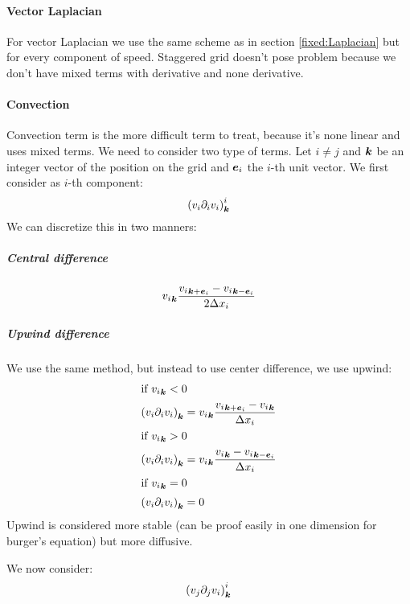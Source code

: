 \paragraph{Vector Laplacian}
\label{fixed:vect:laplacian}
For vector Laplacian we use the same scheme as in section \ref{fixed:Laplacian} but for every component of speed.
Staggered grid doesn't pose problem because we don't have mixed terms with derivative and none derivative.

\paragraph{Convection}

Convection term is the more difficult term to treat, because it's none linear and uses mixed terms.
We need to consider two type of terms. Let $i\neq j$ and ${\boldsymbol {k}}$ be an integer vector of the position on the grid
and ${\boldsymbol {e}}_i$ the $i$-th unit vector.
We first consider as $i$-th component:
\begin{equation}
\left(v_{i}\partial_{i}v_{i}\right)^{i}_{{\boldsymbol {k}}}
\end{equation}
We can discretize this in two manners:

\subparagraph{Central difference}
\begin{equation}
{v_{i}}_{{\boldsymbol {k}}}\frac{{v_{i}}_{{\boldsymbol {k}}+{\boldsymbol {e}}_i}-{v_{i}}_{{\boldsymbol {k}}-{\boldsymbol {e}}_i}}{2\Delta x_{i}}
\end{equation}

\subparagraph{Upwind difference}
\label{fixed:upwind}

We use the same method, but instead to use center difference, we use upwind:
\begin{align}
\intertext{if ${v_{i}}_{{\boldsymbol {k}}}<0$}
\left(v_{i}\partial_{i}v_{i}\right)_{{\boldsymbol {k}}}&={v_{i}}_{{\boldsymbol {k}}}\frac{{v_{i}}_{{\boldsymbol {k}}+{\boldsymbol {e}}_i}-{v_{i}}_{{\boldsymbol {k}}}}{\Delta x_{i}}\\
\intertext{if ${v_{i}}_{{\boldsymbol {k}}}>0$}
\left(v_{i}\partial_{i}v_{i}\right)_{{\boldsymbol {k}}}&={v_{i}}_{{\boldsymbol {k}}}\frac{{v_{i}}_{{\boldsymbol {k}}}-{v_{i}}_{{\boldsymbol {k}}-{\boldsymbol {e}}_i}}{\Delta x_{i}}\\
\intertext{if ${v_{i}}_{{\boldsymbol {k}}}=0$}
\left(v_{i}\partial_{i}v_{i}\right)_{{\boldsymbol {k}}}&=0
\end{align}
Upwind is considered more stable (can be proof easily in one dimension for burger's equation) but more diffusive.

We now consider:
\begin{equation}
\left(v_{j}\partial_{j}v_{i}\right)^{i}_{{\boldsymbol {k}}}
\end{equation}

